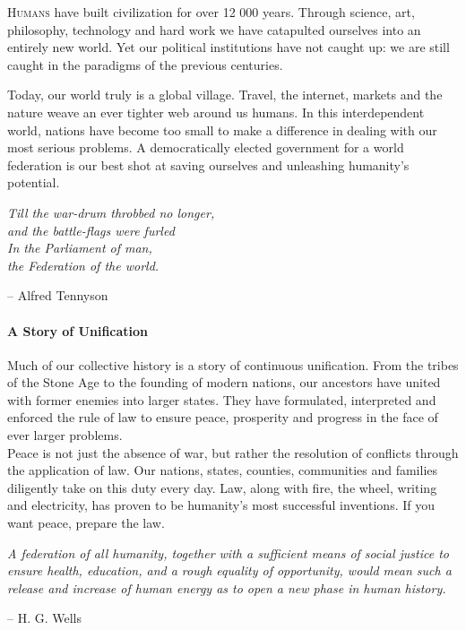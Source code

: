 \documentclass[11pt,a4paper]{article}
\begin{document}
\begin{multicols}{2}
\lettrine[lraise=0.1, lines=2]{\textsc{H}}{umans} have built civilization for over 12 000 years. Through science, art, philosophy, technology and hard work we have catapulted ourselves into an entirely new world. Yet our political institutions have not caught up: we are still caught in the paradigms of the previous centuries.

\noindent Today, our world truly is a global village. Travel, the internet, markets and the nature weave an ever tighter web around us humans. In this interdependent world, nations have become too small to make a difference in dealing with our most serious problems. A democratically elected government for a world federation is our best shot at saving ourselves and unleashing humanity’s potential.


\begin{shaded*}
\noindent \textit{Till the war-drum throbbed no longer,\\
and the battle-flags were furled\\
\noindent In the Parliament of man, \\
the Federation of the world.}
\begin{flushright}
-- Alfred Tennyson
\end{flushright}
\vspace{-12pt}
\end{shaded*}


\paragraph{A Story of Unification}

Much of our collective history is a story of continuous unification.
From the tribes of the Stone Age to the founding of modern nations, our ancestors have united with former enemies into larger states.
They have formulated, interpreted and enforced the rule of law to ensure peace, prosperity and progress in the face of ever larger problems.\\
\noindent Peace is not just the absence of war, but rather the resolution of conflicts through the application of law.
Our nations, states, counties, communities and families diligently take on this duty every day.
Law, along with fire, the wheel, writing and electricity, has proven to be humanity's most successful inventions.
If you want peace, prepare the law.

\begin{shaded*}
\noindent \textit{A federation of all humanity, together with a sufficient means of social justice to ensure health, education, and a rough equality of opportunity, would mean such a release and increase of human energy as to open a new phase in human history.}
\begin{flushright}
-- H. G. Wells
\end{flushright}
\vspace{-12pt}
\end{shaded*}


\end{multicols}
\end{document}

